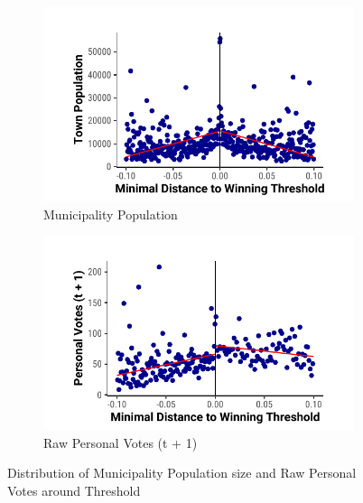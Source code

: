 \documentclass[12pt]{article}
\begin{document}
\begin{figure}[htbp]
    \centering
    \begin{subfigure}[t]{0.48\textwidth}
        \includegraphics[width = 1 \textwidth]{../output/figures/norway_population.pdf}
        \caption{Municipality Population}
        \end{subfigure}%
        \begin{subfigure}[t]{0.48\textwidth}
        \includegraphics[width = 1 \textwidth]{../output/figures/norway_raw_pv.pdf}
        \caption{Raw Personal Votes (t + 1)}
        \end{subfigure}
    \caption{Distribution of Municipality Population size and Raw Personal Votes around Threshold}
    \label{app:norway_pv_plot1}
\end{figure}
\end{document}
